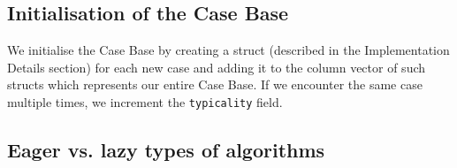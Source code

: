 \documentclass[a4paper]{article}
\begin{document}

\subsection{Initialisation of the Case Base}

We initialise the Case Base by creating a struct (described in the Implementation Details section) for each new case and adding it to the column vector of such structs which represents our entire Case Base. If we encounter the same case multiple times, we increment the \texttt{typicality} field.

\subsection{Eager vs. lazy types of algorithms}
\end{document}

